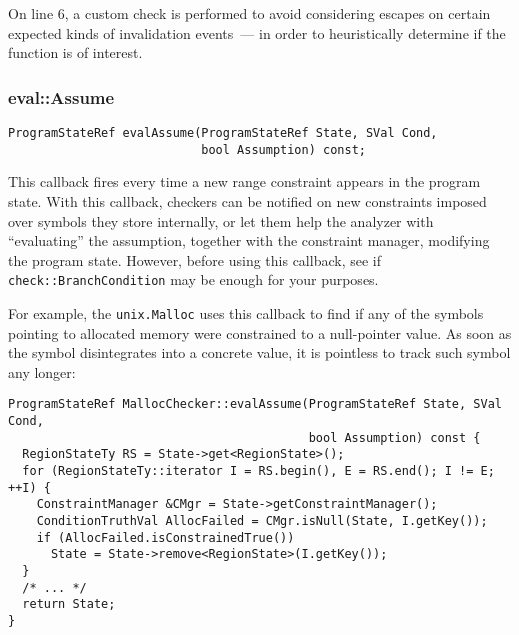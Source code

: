 \documentclass[a4paper,12pt]{article}
\newenvironment{nobr}{\begin{minipage}{\textwidth}\setlength\parskip{1em}
}{\end{minipage}\ignorespacesafterend}
\begin{document}
On line 6, a custom check is performed to avoid considering escapes on certain expected kinds of invalidation events~--- in order to heuristically determine if the function is of interest.


\begin{nobr}
\subsubsection{eval::Assume}

\begin{lstlisting}[style=cplusplus,numbers=none]
ProgramStateRef evalAssume(ProgramStateRef State, SVal Cond,
                           bool Assumption) const;
\end{lstlisting}

This callback fires every time a new range constraint appears in the program state. With this callback, checkers can be notified on new constraints imposed over symbols they store internally, or let them help the analyzer with ``evaluating'' the assumption, together with the constraint manager, modifying the program state. However, before using this callback, see if \lstinline|check::BranchCondition| may be enough for your purposes.
\end{nobr}

\begin{nobr}
For example, the \lstinline|unix.Malloc| uses this callback to find if any of the symbols pointing to allocated memory were constrained to a null-pointer value. As soon as the symbol disintegrates into a concrete value, it is pointless to track such symbol any longer:

\begin{lstlisting}[style=cplusplus]
ProgramStateRef MallocChecker::evalAssume(ProgramStateRef State, SVal Cond,
                                          bool Assumption) const {
  RegionStateTy RS = State->get<RegionState>();
  for (RegionStateTy::iterator I = RS.begin(), E = RS.end(); I != E; ++I) {
    ConstraintManager &CMgr = State->getConstraintManager();
    ConditionTruthVal AllocFailed = CMgr.isNull(State, I.getKey());
    if (AllocFailed.isConstrainedTrue())
      State = State->remove<RegionState>(I.getKey());
  }
  /* ... */
  return State;
}
\end{lstlisting}
\end{nobr}
\end{document}
